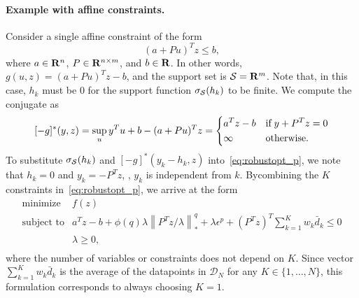 \paragraph{Example with affine constraints.}
Consider a single affine constraint of the form
\begin{equation}
	\label{eq:affineg}
	(a + Pu)^Tz \le b,
\end{equation}
where $a \in {\mathbf R}^n$, $P \in {\mathbf R}^{n \times m}$, and $b \in {\mathbf R}$.
In other words, $g(u, z) = (a + Pu)^Tz - b$, and the support set is $\mathcal{S} = {\mathbf R}^m$.
Note that, in this case, $h_k$ must be $0$ for the support function $\sigma_{\mathcal{S}}(h_k)$ to be finite.
We compute the conjugate as
\begin{equation}
\label{eq:conj_affine}
[-g]^*(y, z) =  \sup_u y^Tu +b - (a + Pu)^Tz =
\begin{dcases} a^Tz - b & \text{if}\; y + P^Tz = 0\\
	\infty & \text{otherwise}.
\end{dcases}
\end{equation}
To substitute $\sigma_{\mathcal{S}}(h_k)$ and $[-g]^*(y_k - h_k, z)$ into~\eqref{eq:robustopt_p}, we note that $h_k = 0$ and $y_k = -P^Tz$, \ie, $y_k$ is independent from $k$.
Bycombining the $K$ constraints in~\eqref{eq:robustopt_p}, we arrive at the form
\begin{equation}
	\label{eq:example-affine-p}
	\begin{array}{ll}
		\mbox{minimize} & f(z)\\
		\mbox{subject to} & a^Tz - b + \phi(q)\lambda \left\|P^Tz/\lambda \right\|^q_*  +\lambda \epsilon^p + (P^Tz)^T\sum_{k=1}^{K} w_k \bar{d}_k \le 0\\
		& \lambda \ge 0,\\
	\end{array}
\end{equation}
where the number of variables or constraints does not depend on $K$.
Since vector $\sum_{k=1}^{K} w_k \bar{d}_k$ is the average of the datapoints in $\mathcal{D}_N$ for any $K \in \{1,\dots,N\}$, this formulation corresponds to always choosing $K=1$.


